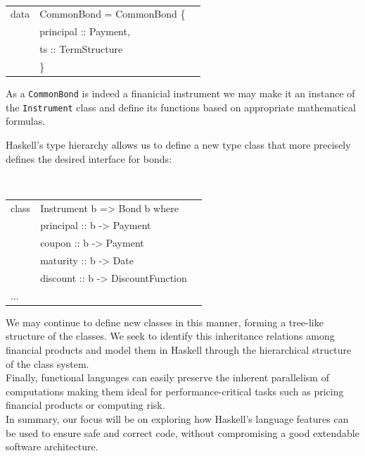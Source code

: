 \documentclass[11pt]{article}
\begin{document}
\begin{center}
\tt
\begin{tabular}{lll}
data & CommonBond = CommonBond \{\\
      &\hspace{-1cm} principal :: Payment,\\
      &\hspace{-1cm} ts :: TermStructure\\
      &\hspace{-1cm}\}
\end{tabular}
\end{center}

As a {\tt CommonBond} is indeed a finanicial instrument we may make it an instance of
the {\tt Instrument} class and define its functions based on appropriate mathematical
formulas.

Haskell's type hierarchy allows us to define a new type class that more precisely
defines the desired interface for bonds:

\begin{center}
\tt
\begin{tabular}{lll}
class & Instrument b => Bond b where\\
      &\hspace{-1cm} principal :: b -> Payment\\
      &\hspace{-1cm} coupon    :: b -> Payment\\
      &\hspace{-1cm} maturity  :: b -> Date\\
      &\hspace{-1cm} discount  :: b -> DiscountFunction\\
      ...
\end{tabular}
\end{center}

We may continue to define new classes in this manner, forming a tree-like
structure of the classes. We seek to identify this inheritance relations among
financial products and model them in Haskell through the hierarchical structure
of the class system.\\

Finally, functional languages can easily preserve the inherent parallelism of computations 
making them ideal for performance-critical tasks such as pricing financial products or
computing risk.\\

In summary, our focus will be on exploring how Haskell's language features can be used
to ensure safe and correct code, without compromising a good extendable software architecture.
\end{document}
